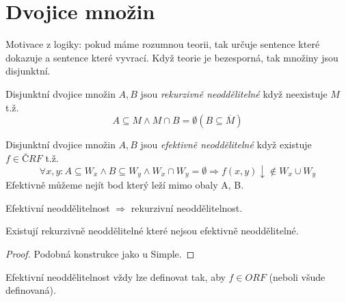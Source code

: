 \section{\texorpdfstring{Dvojice množin}{Dvojice množin}}
\vspace{5mm}
\large

\begin{note}
	Motivace z logiky: pokud máme rozumnou teorii, tak určuje sentence které dokazuje a sentence které vyvrací.
	Když teorie je bezesporná, tak množiny jsou disjunktní.
\end{note}

\begin{definition}
	Disjunktní dvojice množin $A, B$ jsou \emph{rekurzivně neoddělitelné} když neexistuje $M$ t.ž.
	\[ A \subseteq M \land M \cap B = \emptyset (B \subseteq \overline{M}) \]
\end{definition}

\begin{definition}
	Disjunktní dvojice množin $A, B$ jsou \emph{efektivně neoddělitelné} když existuje $f \in ČRF$ t.ž.
	\[ \forall x, y: A \subseteq W_x \land B \subseteq W_y \land W_x \cap W_y = \emptyset \Rightarrow f(x, y) \downarrow \notin W_x \cup W_y \]
	Efektivně můžeme nejít bod který leží mimo obaly A, B.
\end{definition}

\begin{note}
	Efektivní neoddělitelnost $\Rightarrow$ rekurzivní neoddělitelnost.
\end{note}

\begin{theorem}
	Existují rekurzivně neoddělitelné které nejsou efektivně neoddělitelné.
\end{theorem}
\begin{proof}
	Podobná konstrukce jako u Simple.
\end{proof}

\begin{note}
	Efektivní neoddělitelnost vždy lze definovat tak, aby $f \in ORF$ (neboli všude definovaná).
\end{note}

